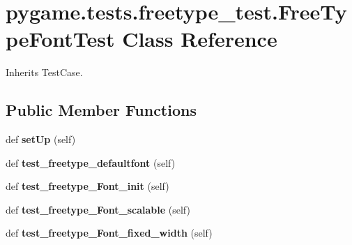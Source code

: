 \hypertarget{classpygame_1_1tests_1_1freetype__test_1_1_free_type_font_test}{}\section{pygame.\+tests.\+freetype\+\_\+test.\+Free\+Type\+Font\+Test Class Reference}
\label{classpygame_1_1tests_1_1freetype__test_1_1_free_type_font_test}


Inherits Test\+Case.

\subsection*{Public Member Functions}
\begin{DoxyCompactItemize}
\item 
\mbox{\label{classpygame_1_1tests_1_1freetype__test_1_1_free_type_font_test_a0ed7853dca38571eadedab16c4be8788}} 
def {\bfseries set\+Up} (self)
\item 
\mbox{\label{classpygame_1_1tests_1_1freetype__test_1_1_free_type_font_test_a963aa39b159a0ae5be5d958410ab2eea}} 
def {\bfseries test\+\_\+freetype\+\_\+defaultfont} (self)
\item 
\mbox{\label{classpygame_1_1tests_1_1freetype__test_1_1_free_type_font_test_aaa62577edfd9cee3ac73dc537326d855}} 
def {\bfseries test\+\_\+freetype\+\_\+\+Font\+\_\+init} (self)
\item 
\mbox{\label{classpygame_1_1tests_1_1freetype__test_1_1_free_type_font_test_abe2d4d82d1b64a258e8648ac46fec167}} 
def {\bfseries test\+\_\+freetype\+\_\+\+Font\+\_\+scalable} (self)
\item 
\mbox{\label{classpygame_1_1tests_1_1freetype__test_1_1_free_type_font_test_a8eecbe9de6cd166a423bc67de225f976}} 
def {\bfseries test\+\_\+freetype\+\_\+\+Font\+\_\+fixed\+\_\+width} (self)
\item 
\mbox{\label{classpygame_1_1tests_1_1freetype__test_1_1_free_type_font_test_a475bbc5cd0297f4f36c445d3647bb772}} 

\end{DoxyCompactItemize}
